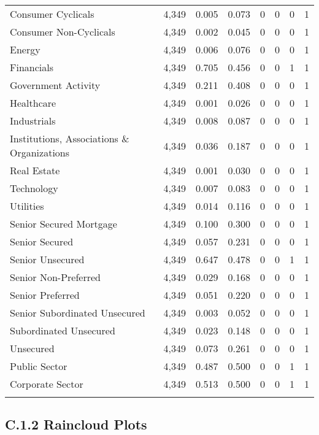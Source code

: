 \begin{table}[!htbp]
\begin{tabular}{@{\extracolsep{5pt}}lccccccc}
Consumer Cyclicals & 4,349 & 0.005 & 0.073 & 0 & 0 & 0 & 1 \\ 
Consumer Non-Cyclicals & 4,349 & 0.002 & 0.045 & 0 & 0 & 0 & 1 \\ 
Energy & 4,349 & 0.006 & 0.076 & 0 & 0 & 0 & 1 \\ 
Financials & 4,349 & 0.705 & 0.456 & 0 & 0 & 1 & 1 \\ 
Government Activity & 4,349 & 0.211 & 0.408 & 0 & 0 & 0 & 1 \\ 
Healthcare & 4,349 & 0.001 & 0.026 & 0 & 0 & 0 & 1 \\ 
Industrials & 4,349 & 0.008 & 0.087 & 0 & 0 & 0 & 1 \\ 
Institutions, Associations \& Organizations & 4,349 & 0.036 & 0.187 & 0 & 0 & 0 & 1 \\ 
Real Estate & 4,349 & 0.001 & 0.030 & 0 & 0 & 0 & 1 \\ 
Technology & 4,349 & 0.007 & 0.083 & 0 & 0 & 0 & 1 \\ 
Utilities & 4,349 & 0.014 & 0.116 & 0 & 0 & 0 & 1 \\ 
Senior Secured Mortgage & 4,349 & 0.100 & 0.300 & 0 & 0 & 0 & 1 \\ 
Senior Secured & 4,349 & 0.057 & 0.231 & 0 & 0 & 0 & 1 \\ 
Senior Unsecured & 4,349 & 0.647 & 0.478 & 0 & 0 & 1 & 1 \\ 
Senior Non-Preferred & 4,349 & 0.029 & 0.168 & 0 & 0 & 0 & 1 \\ 
Senior Preferred & 4,349 & 0.051 & 0.220 & 0 & 0 & 0 & 1 \\ 
Senior Subordinated Unsecured & 4,349 & 0.003 & 0.052 & 0 & 0 & 0 & 1 \\ 
Subordinated Unsecured & 4,349 & 0.023 & 0.148 & 0 & 0 & 0 & 1 \\ 
Unsecured & 4,349 & 0.073 & 0.261 & 0 & 0 & 0 & 1 \\ 
Public Sector & 4,349 & 0.487 & 0.500 & 0 & 0 & 1 & 1 \\ 
Corporate Sector & 4,349 & 0.513 & 0.500 & 0 & 0 & 1 & 1 \\ 
\hline \\[-1.8ex] 
\end{tabular} 
\end{table} 

\newpage

\subsection{C.1.2 Raincloud Plots}

